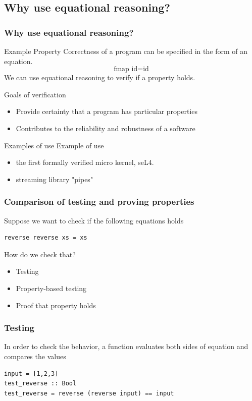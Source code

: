 \documentclass{beamer}
\begin{document}
\appendix

\subsection{Why use equational reasoning?}
\begin{frame}
\frametitle{Why use equational reasoning?}
\begin{block}{Example Property}
Correctness of a program can be specified in the form of an equation.
\begin{equation}
\text{fmap } \text{id}  =  \text{id}  
\end{equation}
We can use equational reasoning to verify if a property holds.  
\end{block}
\begin{block}{Goals of verification}
\begin{itemize}
\item Provide certainty that a program has particular properties
\item Contributes to the reliability and robustness of a software
\end{itemize}  
\end{block}
\begin{block}{Examples of use}
Example of use
\begin{itemize}
\item the first formally verified micro kernel, seL4.
\item streaming library "pipes"
\end{itemize}  
\end{block}
\end{frame}



\begin{frame}[fragile]
  \frametitle{Comparison of testing and proving properties}
  Suppose we want to check if the following equations holds
\begin{verbatim}
reverse reverse xs = xs
\end{verbatim}
How do we check that?
\begin{itemize}
\item Testing
\item Property-based testing
\item Proof that property holds
\end{itemize}

\end{frame}

\begin{frame}[fragile]
  \frametitle{Testing}
 In order to check the behavior, a function evaluates both sides of equation and compares the values
\begin{verbatim}
input = [1,2,3]
test_reverse :: Bool
test_reverse = reverse (reverse input) == input
\end{verbatim}
\end{frame}
\end{document}
